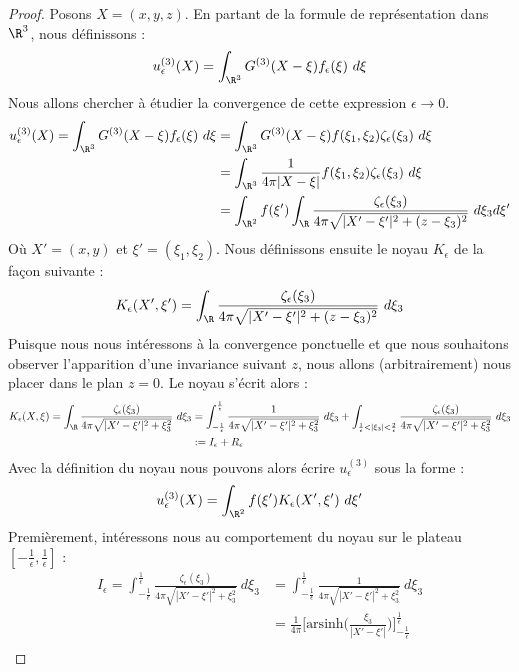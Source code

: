 \begin{proof}
Posons $X = (x,y,z)$. En partant de la formule de représentation dans $\R^3$, nous définissons :
$$ u^{(3)}_{\epsilon}(X) = \int_{\R^3} G^{(3)}(X - \xi) f_{\epsilon}(\xi) \ d\xi $$
Nous allons chercher à étudier la convergence de cette expression $\epsilon \to 0$.
\begin{align*}
    u^{(3)}_{\epsilon}(X) = \int_{\R^3} G^{(3)}(X - \xi)f_{\epsilon}(\xi) \ d\xi &= \int_{\R^3} G^{(3)}(X - \xi) f(\xi_1,\xi_2)\zeta_{\epsilon}(\xi_3) \ d\xi \\
    &= \int_{\R^3} \frac{1}{4\pi |X - \xi|} f(\xi_1,\xi_2)\zeta_{\epsilon}(\xi_3) \ d\xi \\
    &= \int_{\R^2} f(\xi') \int_{\R} \frac{\zeta_{\epsilon}(\xi_3)}{4\pi \sqrt{|X' - \xi'|^2 + (z - \xi_3)^2}} \ d\xi_3 d\xi'
\end{align*}
Où $X' = (x,y)$ et $\xi' = (\xi_1,\xi_2)$.
Nous définissons ensuite le noyau $K_{\epsilon}$ de la façon suivante : 
$$ K_{\epsilon}(X',\xi') = \int_{\R} \frac{\zeta_{\epsilon}(\xi_3)}{4\pi \sqrt{|X' - \xi'|^2 + (z - \xi_3)^2}} \ d\xi_3 $$ 
Puisque nous nous intéressons à la convergence ponctuelle et que nous souhaitons observer l'apparition d'une invariance suivant $z$, nous allons (arbitrairement) nous placer dans le plan $z=0$. Le noyau s'écrit alors :
\begin{align*}
    K_{\epsilon}(X,\xi) = \int_{\R} \frac{\zeta_{\epsilon}(\xi_3)}{4\pi \sqrt{|X' - \xi'|^2 + \xi_{3}^2}} \ d \xi_3 &= \int_{-\frac{1}{\epsilon}}^{\frac{1}{\epsilon}} \frac{1}{4\pi \sqrt{|X' - \xi'|^2 + \xi_3^2}} \ d\xi_3 + \int_{\frac{1}{\epsilon} < |\xi_3| < \frac{2}{\epsilon}} \frac{\zeta_{\epsilon}(\xi_3)}{4\pi \sqrt{|X' - \xi'|^2 + \xi_3^2}} \ d\xi_3\\
    &:= I_{\epsilon} + R_{\epsilon}
\end{align*}
Avec la définition du noyau nous pouvons alors écrire $u^{(3)}_{\epsilon}$ sous la forme :
$$ u^{(3)}_{\epsilon}(X) = \int_{\R^2} f(\xi') K_{\epsilon}(X',\xi') \ d\xi' $$
Premièrement, intéressons nous au comportement du noyau sur le plateau $[-\frac{1}{\epsilon},\frac{1}{\epsilon}]$ :
\begin{align*}
    I_{\epsilon} = \int_{-\frac{1}{\epsilon}}^{\frac{1}{\epsilon}} \frac{\zeta_{\epsilon} (\xi_3)}{4\pi \sqrt{|X' - \xi'|^2 + \xi_3^2}} \ d\xi_3 &= \int_{-\frac{1}{\epsilon}}^{\frac{1}{\epsilon}} \frac{1}{4\pi \sqrt{|X' - \xi'|^2 + \xi_3^2}} \ d\xi_3 \\
    &= \frac{1}{4\pi} \Big[ \text{arsinh}\Big( \frac{\xi_3}{|X' - \xi'|} \Big) \Big]_{-\frac{1}{\epsilon}}^{\frac{1}{\epsilon}} \\

\end{align*}
\end{proof}
